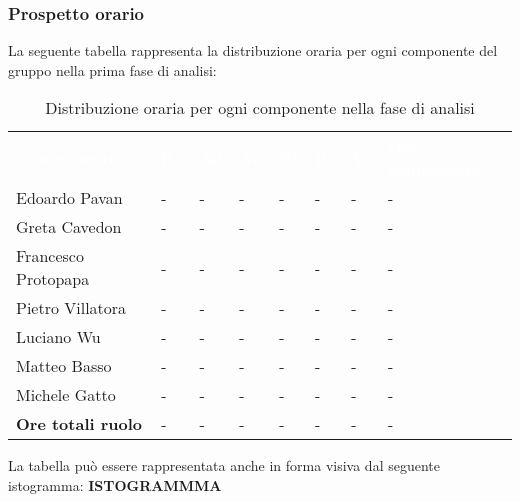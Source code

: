 \subsubsection{Prospetto orario}
La seguente tabella rappresenta la distribuzione oraria per ogni componente del gruppo nella prima fase di analisi:
\begin{table}[!htbp]
\begin{center}
\renewcommand{\arraystretch}{1.25}
\begin{tabular}{ m{}<{\centering}  m{}<{\centering} m{}<{\centering} m{}<{\centering}  m{}<{\centering}  m{}<{\centering}  m{}<{\centering}  m{}<{\centering}   }
	\rowcolor{darkblue}
	\textcolor{white}{\textbf{Componente}} &\textcolor{white}{\textbf{Re}}&\textcolor{white}{\textbf{Ad}}&\textcolor{white}{\textbf{An}}&\textcolor{white}{\textbf{Pt}}&\textcolor{white}{\textbf{Pr}}&\textcolor{white}{\textbf{Ve}}&\textcolor{white}{\textbf{Ore complessive}}\\ 

	Edoardo Pavan & - & - & - & - & - & - & -\\	

	\rowcolor{gray!10} Greta Cavedon & - & - & - & - & - & - & -\\
	
	Francesco Protopapa & - & - & - & - & - & - & -\\
	
	\rowcolor{gray!10} Pietro Villatora & - & - & - & - & - & - & -\\
	
	Luciano Wu & - & - & - & - & - & - & -\\
	
	\rowcolor{gray!10} Matteo Basso & - & - & - & - & - & - & -\\
	
	Michele Gatto & - & - & - & - & - & - & -\\
	
	\rowcolor{gray!10} \textbf{Ore totali ruolo} & - & - & - & - & - & - & -\\

\end{tabular}
\caption{Distribuzione oraria per ogni componente nella fase di analisi}
\end{center}
\end{table}

La tabella può essere rappresentata anche in forma visiva dal seguente istogramma: \textbf{ISTOGRAMMMA}

